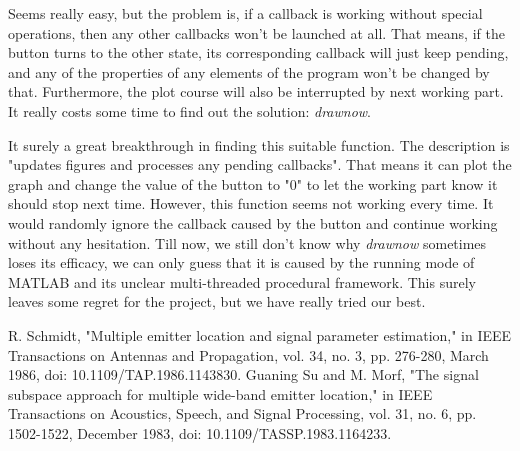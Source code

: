 \documentclass[UTF8]{article}
\begin{document}
Seems really easy, but the problem is, if a callback is working without
special operations, then any other callbacks won't be launched at all.
That means, if the button turns to the other state, its corresponding
callback will just keep pending, and any of the properties of any
elements of the program won't be changed by that. Furthermore, the plot
course will also be interrupted by next working part. It really costs
some time to find out the solution: \emph{drawnow}.

It surely a great breakthrough in finding this suitable function. The
description is "updates figures and processes any pending callbacks".
That means it can plot the graph and change the value of the button to
"0" to let the working part know it should stop next time. However, this
function seems not working every time. It would randomly ignore the
callback caused by the button and continue working without any
hesitation. Till now, we still don't know why \emph{drawnow} sometimes
loses its efficacy, we can only guess that it is caused by the running
mode of MATLAB and its unclear multi-threaded procedural framework. This
surely leaves some regret for the project, but we have really tried our
best.

\begin{thebibliography}{2}
     R. Schmidt, "Multiple emitter location and signal parameter estimation," in IEEE Transactions on Antennas and Propagation, vol. 34, no. 3, pp. 276-280, March 1986, doi: 10.1109/TAP.1986.1143830.
     Guaning Su and M. Morf, "The signal subspace approach for multiple wide-band emitter location," in IEEE Transactions on Acoustics, Speech, and Signal Processing, vol. 31, no. 6, pp. 1502-1522, December 1983, doi: 10.1109/TASSP.1983.1164233.
\end{thebibliography}
\end{document}
